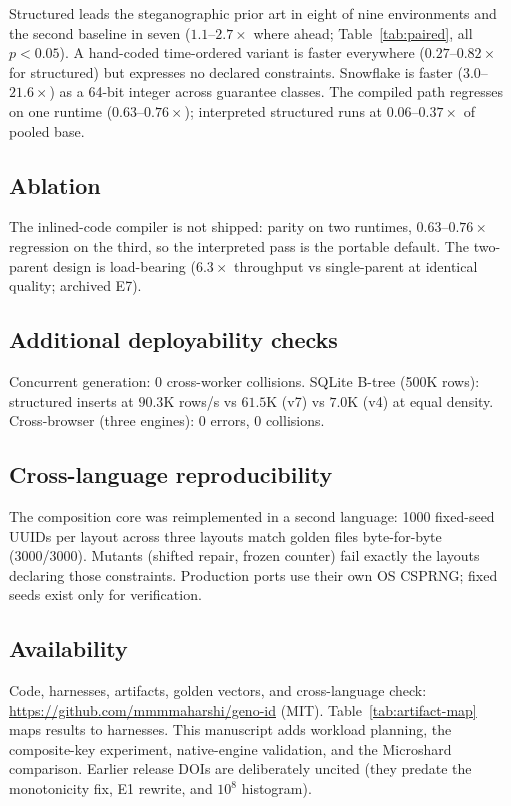 \documentclass{svproc}
\begin{document}
Structured leads the steganographic prior art in eight of nine environments and the second baseline in seven ($1.1$--$2.7\times$ where ahead; Table~\ref{tab:paired}, all $p<0.05$). A hand-coded time-ordered variant is faster everywhere ($0.27$--$0.82\times$ for structured) but expresses no declared constraints. Snowflake is faster ($3.0$--$21.6\times$) as a 64-bit integer across guarantee classes. The compiled path regresses on one runtime ($0.63$--$0.76\times$); interpreted structured runs at $0.06$--$0.37\times$ of pooled base.

\subsection{Ablation}
\label{sec:ablation}
The inlined-code compiler is not shipped: parity on two runtimes, $0.63$--$0.76\times$ regression on the third, so the interpreted pass is the portable default. The two-parent design is load-bearing ($6.3\times$ throughput vs single-parent at identical quality; archived E7).

\subsection{Additional deployability checks}
\label{sec:deployability}
Concurrent generation: 0 cross-worker collisions. SQLite B-tree (500K rows): structured inserts at $90.3$K rows/s vs $61.5$K (v7) vs $7.0$K (v4) at equal density. Cross-browser (three engines): 0 errors, 0 collisions.

\subsection{Cross-language reproducibility}
\label{sec:cross-lang}

The composition core was reimplemented in a second language: 1000 fixed-seed UUIDs per layout across three layouts match golden files byte-for-byte (3000/3000). Mutants (shifted repair, frozen counter) fail exactly the layouts declaring those constraints. Production ports use their own OS CSPRNG; fixed seeds exist only for verification.

\subsection*{Availability}
Code, harnesses, artifacts, golden vectors, and cross-language check: \url{https://github.com/mmmmaharshi/geno-id} (MIT). Table~\ref{tab:artifact-map} maps results to harnesses. This manuscript adds workload planning, the composite-key experiment, native-engine validation, and the Microshard comparison. Earlier release DOIs are deliberately uncited (they predate the monotonicity fix, E1 rewrite, and $10^8$ histogram).
\end{document}

